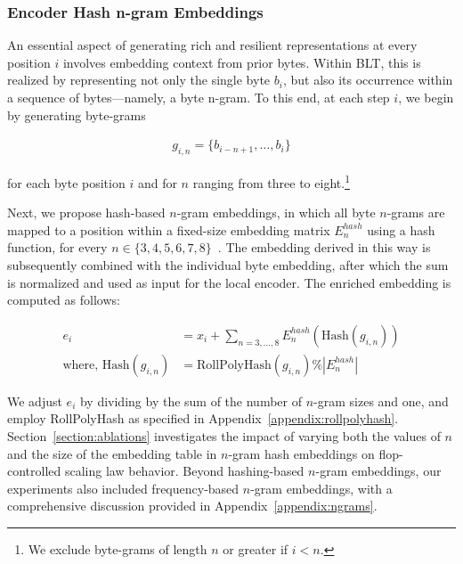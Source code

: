 \subsubsection{Encoder Hash n-gram Embeddings}
\label{sec:ngram-emb}
\label{sec:hash-emb}
An essential aspect of generating rich and resilient representations at every position $i$ involves embedding context from prior bytes. Within {\textsc BLT}, this is realized by representing not only the single byte $b_i$, but also its occurrence within a sequence of bytes—namely, a byte n-gram. To this end, at each step $i$, we begin by generating byte-grams

\begin{align}
    g_{i,n}=\{b_{i-n + 1},\ldots, b_i\}
\end{align}

for each byte position $i$ and for $n$ ranging from three to eight.\footnote{
We exclude byte-grams of length $n$ or greater if $i<n$. }

Next, we propose hash-based $n$-gram embeddings, in which all byte $n$-grams are mapped to a position within a fixed-size embedding matrix $E_{n}^{hash}$ using a hash function, for every $n \in\{3,4,5,6,7,8\}$~\citep{bai2010learning}. The embedding derived in this way is subsequently combined with the individual byte embedding, after which the sum is normalized and used as input for the local encoder. The enriched embedding is computed as follows:

\begin{align}
e_i &= x_i + \sum_{n = 3,...,8}E_{n}^{hash}(\text{Hash}(g_{i,n})) \\
\text{where, Hash}(g_{i,n}) &= \text{RollPolyHash}(g_{i,n}) \% |E_{n}^{hash}|
\end{align}

We adjust $e_i$ by dividing by the sum of the number of $n$-gram sizes and one, and employ RollPolyHash as specified in Appendix~\ref{appendix:rollpolyhash}. Section~\ref{section:ablations} investigates the impact of varying both the values of $n$ and the size of the embedding table in $n$-gram hash embeddings on flop-controlled scaling law behavior. Beyond hashing-based $n$-gram embeddings, our experiments also included frequency-based $n$-gram embeddings, with a comprehensive discussion provided in Appendix~\ref{appendix:ngrams}.


